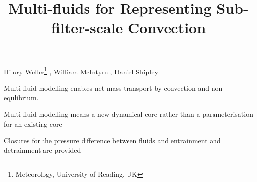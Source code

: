 \documentclass[draft]{agujournal2019}
\begin{document}
\title{Multi-fluids for Representing Sub-filter-scale Convection}

\authors
{
    Hilary Weller\thanks{Meteorology, University of Reading, UK}
    ,
    William McIntyre
    ,
    Daniel Shipley
}



\begin{keypoints}
\item Multi-fluid modelling enables net mass transport by  convection and non-equlibrium.
\item Multi-fluid modelling means a new dynamical core rather than a parameterisation for an existing core
\item Closures for the pressure difference between fluids and entrainment and detrainment are provided
\end{keypoints}
\end{document}
